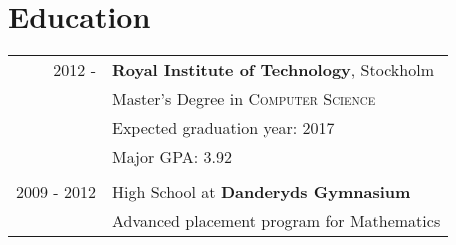 \documentclass[a4paper,10pt]{article} %
\begin{document}
\pagestyle{fancy} %



\par{\bigskip\par} %




\section{Education}

\begin{tabular}{rl}	
\textsc{2012 - } & \textbf{Royal Institute of Technology}, Stockholm\\
& Master's Degree in \textsc{Computer Science}\\
& Expected graduation year: 2017\\
& Major GPA\footnotemark[1]: 3.92\\
&\\
\textsc{2009 - 2012} & High School at \textbf{Danderyds Gymnasium}\\&Advanced placement program for Mathematics\\
\end{tabular}
\end{document}
